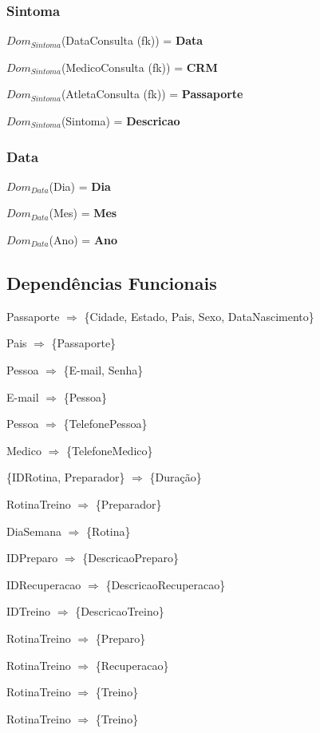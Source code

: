 \documentclass[12pt,a4paper]{article}
\newcommand{\createdomain}[3]{
    $Dom_{#1}$(#2) = {\bf #3}

}
\begin{document}
    \subsubsection{Sintoma}
        \createdomain{Sintoma}{DataConsulta (fk)}{\bf Data}
        \createdomain{Sintoma}{MedicoConsulta (fk)}{\bf CRM}
        \createdomain{Sintoma}{AtletaConsulta (fk)}{\bf Passaporte}
        \createdomain{Sintoma}{Sintoma}{\bf Descricao}

    \subsubsection{Data}
        \createdomain{Data}{Dia}{\bf Dia}
        \createdomain{Data}{Mes}{\bf Mes}
        \createdomain{Data}{Ano}{\bf Ano}

\newpage

\subsection{Dependências Funcionais}

\singlespacing
Passaporte $\Longrightarrow$ \{Cidade, Estado, Pais, Sexo, DataNascimento\}\par
Pais $\Longrightarrow$ \{Passaporte\} \par
Pessoa $\Longrightarrow$ \{E-mail, Senha\} \par
E-mail $\Longrightarrow$ \{Pessoa\} \par
Pessoa $\Longrightarrow$ \{TelefonePessoa\} \par
Medico $\Longrightarrow$ \{TelefoneMedico\} \par
\{IDRotina, Preparador\} $\Longrightarrow$ \{Duração\} \par
RotinaTreino $\Longrightarrow$ \{Preparador\} \par
DiaSemana $\Longrightarrow$ \{Rotina\} \par
IDPreparo $\Longrightarrow$ \{DescricaoPreparo\} \par
IDRecuperacao $\Longrightarrow$ \{DescricaoRecuperacao\} \par
IDTreino $\Longrightarrow$ \{DescricaoTreino\} \par
RotinaTreino $\Longrightarrow$ \{Preparo\} \par
RotinaTreino $\Longrightarrow$ \{Recuperacao\} \par
RotinaTreino $\Longrightarrow$ \{Treino\} \par
RotinaTreino $\Longrightarrow$ \{Treino\} \par
\end{document}
